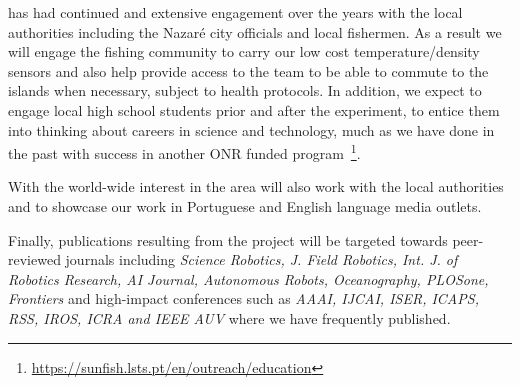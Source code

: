\inst has had continued and extensive engagement over the years with
the local authorities including the Nazar\'e city officials and local
fishermen. As a result we will engage the fishing community to carry
our low cost temperature/density sensors and also help provide access
to the team to be able to commute to the islands when necessary,
subject to health protocols. In addition, we expect to engage local
high school students prior and after the experiment, to entice them
into thinking about careers in science and technology, much as we have
done in the past with success in another ONR funded
program~\footnote{\url{https://sunfish.lsts.pt/en/outreach/education}}.

With the world-wide interest in the area \proj will also work with the
local authorities and \inst to showcase our work in Portuguese and
English language media outlets.

Finally, publications resulting from the project will be targeted
towards peer-reviewed journals including \emph{Science Robotics,
  J. Field Robotics, Int. J. of Robotics Research, AI Journal,
  Autonomous Robots, Oceanography, PLOSone, Frontiers} and high-impact
conferences such as \emph{AAAI, IJCAI, ISER, ICAPS, RSS, IROS, ICRA
  and IEEE AUV} where we have frequently published.

